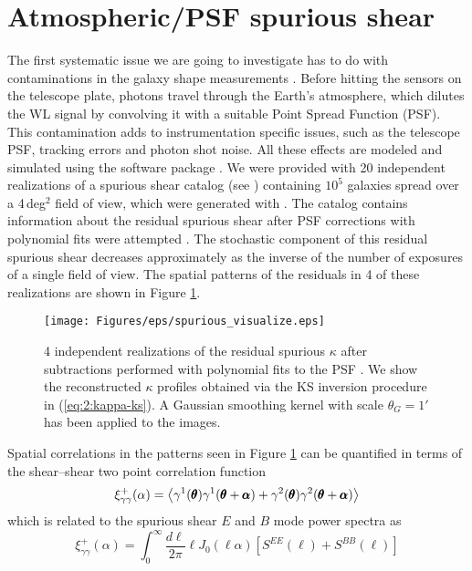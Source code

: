 \section{Atmospheric/PSF spurious shear}
\label{sec:7:spurious}
The first systematic issue we are going to investigate has to do with contaminations in the galaxy shape measurements \citep{PetriSpShear}. Before hitting the sensors on the telescope plate, photons travel through the Earth's atmosphere, which dilutes the WL signal by convolving it with a suitable Point Spread Function (PSF). This contamination adds to instrumentation specific issues, such as the telescope PSF, tracking errors and photon shot noise. All these effects are modeled and simulated using the  software package \citep{LSSTOperations}. We were provided with 20 independent realizations of a spurious shear catalog (see \citep{ChangLSST}) containing $10^5$ galaxies spread over a 4\,deg$^2$ field of view, which were generated with . The catalog contains information about the residual spurious shear after PSF corrections with polynomial fits were attempted \citep{ChangLSST}. The stochastic component of this residual spurious shear decreases approximately as the inverse of the number of exposures of a single field of view. The spatial patterns of the residuals in 4 of these realizations are shown in Figure \ref{fig:7:spvisualize}. 
%
\begin{figure}
\begin{center}
\texttt{[image: Figures/eps/spurious\_visualize.eps]}
\end{center}
\caption{4 independent realizations of the residual spurious $\kappa$ after subtractions performed with polynomial fits to the PSF \citep{ChangLSST}. We show the reconstructed $\kappa$ profiles obtained via the KS inversion procedure in (\ref{eq:2:kappa-ks}). A Gaussian smoothing kernel with scale $\theta_G=1'$ has been applied to the images.}
\label{fig:7:spvisualize}
\end{figure}
%
Spatial correlations in the patterns seen in Figure \ref{fig:7:spvisualize} can be quantified in terms of the shear--shear two point correlation function
\begin{equation}
\label{eq:7:shear2pt}
\xi_{\gamma\gamma}^+(\alpha) = \left\langle\gamma^1(\pmb{\theta})\gamma^1(\pmb{\theta}+\pmb{\alpha})+\gamma^2(\pmb{\theta})\gamma^2(\pmb{\theta}+\pmb{\alpha})\right\rangle
\end{equation} 
%
which is related to the spurious shear $E$ and $B$ mode power spectra as 
\begin{equation}
\label{eq:7:shearPow}
\xi_{\gamma\gamma}^+(\alpha) = \int_0^\infty \frac{d\ell}{2\pi}\ell J_0(\ell\alpha)[S^{EE}(\ell)+S^{BB}(\ell)] 
\end{equation}
